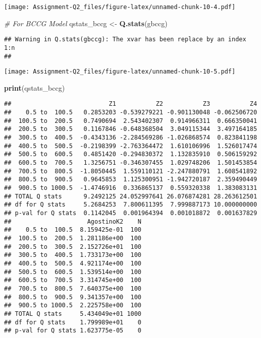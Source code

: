 \documentclass[
]{article}
\newenvironment{Shaded}{\begin{snugshade}}{\end{snugshade}}
\newcommand{\CommentTok}[1]{\textcolor[rgb]{0.56,0.35,0.01}{\textit{#1}}}
\newcommand{\FunctionTok}[1]{\textcolor[rgb]{0.13,0.29,0.53}{\textbf{#1}}}
\newcommand{\NormalTok}[1]{#1}
\newcommand{\OtherTok}[1]{\textcolor[rgb]{0.56,0.35,0.01}{#1}}
\begin{document}
\texttt{[image: Assignment-Q2\_files/figure-latex/unnamed-chunk-10-4.pdf]}

\begin{Shaded}
\begin{Highlighting}[]
\CommentTok{\# For BCCG Model}
\NormalTok{qstats\_bccg }\OtherTok{\textless{}{-}} \FunctionTok{Q.stats}\NormalTok{(gbccg)}
\end{Highlighting}
\end{Shaded}

\begin{verbatim}
## Warning in Q.stats(gbccg): The xvar has been replace by an index 1:n 
## 
\end{verbatim}

\texttt{[image: Assignment-Q2\_files/figure-latex/unnamed-chunk-10-5.pdf]}

\begin{Shaded}
\begin{Highlighting}[]
\FunctionTok{print}\NormalTok{(qstats\_bccg)}
\end{Highlighting}
\end{Shaded}

\begin{verbatim}
##                           Z1           Z2           Z3           Z4
##    0.5 to  100.5   0.2853203 -0.539279221 -0.901130048 -0.062506720
##  100.5 to  200.5   0.7490694  2.543402307  0.914966311  0.666350041
##  200.5 to  300.5   0.1167846 -0.648368504  3.049115344  3.497164185
##  300.5 to  400.5  -0.4343136 -2.284569286 -1.026868574  0.823841198
##  400.5 to  500.5  -0.2198399 -2.763364472  1.610106996  1.526017474
##  500.5 to  600.5   0.4851420 -0.294830372  1.132835910  0.506159292
##  600.5 to  700.5   1.3256751 -0.346307455  1.029748206  1.501453854
##  700.5 to  800.5  -1.8050445  1.559110121 -2.247880791  1.608541892
##  800.5 to  900.5   0.9645853  1.125300951 -1.942720187  2.359490449
##  900.5 to 1000.5  -1.4746916  0.336865137  0.559320338  1.383083131
## TOTAL Q stats      9.2492125 24.052997641 26.076874281 28.263612501
## df for Q stats     5.2684253  7.800611395  7.999887173 10.000000000
## p-val for Q stats  0.1142045  0.001964394  0.001018872  0.001637829
##                     AgostinoK2    N
##    0.5 to  100.5  8.159425e-01  100
##  100.5 to  200.5  1.281186e+00  100
##  200.5 to  300.5  2.152726e+01  100
##  300.5 to  400.5  1.733173e+00  100
##  400.5 to  500.5  4.921174e+00  100
##  500.5 to  600.5  1.539514e+00  100
##  600.5 to  700.5  3.314745e+00  100
##  700.5 to  800.5  7.640375e+00  100
##  800.5 to  900.5  9.341357e+00  100
##  900.5 to 1000.5  2.225758e+00  100
## TOTAL Q stats     5.434049e+01 1000
## df for Q stats    1.799989e+01    0
## p-val for Q stats 1.623775e-05    0
\end{verbatim}
\end{document}
